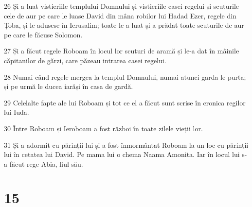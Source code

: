\par 26 Și a luat vistieriile templului Domnului și vistieriile casei regelui și scuturile cele de aur pe care le luase David din mâna robilor lui Hadad Ezer, regele din Țoba, și le adusese în Ierusalim; toate le-a luat și a prădat toate scuturile de aur pe care le făcuse Solomon.
\par 27 Și a făcut regele Roboam în locul lor scuturi de aramă și le-a dat în mâinile căpitanilor de gărzi, care păzeau intrarea casei regelui.
\par 28 Numai când regele mergea la templul Domnului, numai atunci garda le purta; și pe urmă le ducea iarăși în casa de gardă.
\par 29 Celelalte fapte ale lui Roboam și tot ce el a făcut sunt scrise în cronica regilor lui Iuda.
\par 30 Între Roboam și Ieroboam a fost război în toate zilele vieții lor.
\par 31 Și a adormit cu părinții lui și a fost înmormântat Roboam la un loc cu părinții lui în cetatea lui David. Pe mama lui o chema Naama Amonita. Iar în locul lui s-a făcut rege Abia, fiul său.

\chapter{15}

